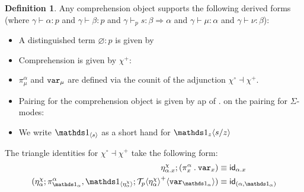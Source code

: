 \documentclass[10pt]{article}
\theoremstyle{definition}
\newtheorem{definition}{Definition}
\let\emptyset\varnothing
\newcommand\dsd[1]{\ensuremath{\mathsf{#1}}}
\newcommand{\yields}{\vdash}
\newcommand{\tcell}{\Rightarrow}
\newcommand{\app}[2]{\ensuremath{#1 \: #2}}
\newcommand{\fst}[1]{\app{\dsd{fst}}{#1}}
\newcommand{\snd}[1]{\app{\dsd{snd}}{#1}}
\newcommand{\id}{\mathsf{id}}
\newcommand\TermTwoT[5]{\ensuremath{#1 \vdash_{#5} {#2} : #3 \tcell #4}}
\newcommand\TrPlus[2]{\ensuremath{{#1}^+(#2)}}
\newcommand\El[2]{\mathcal{T}_{#1}(#2)}
\newcommand\ApEl[2]{\mathcal{T}_{#1}\langle#2\rangle}
\newcommand\bdot[0]{\mathbin{.}}
\newcommand\ap[2]{\ensuremath{#1 \langle #2 \rangle }}
\newcommand\ApPlus[2]{\ensuremath{{#1}^+ \langle #2 \rangle }}
\begin{document}
\begin{definition}
Any comprehension object supports the following derived forms (where $\gamma \yields \alpha : p$
and $\gamma \yields \beta : p$ and
$\TermTwoT{\gamma}{s}{\beta}{\alpha}{p}$ and $\gamma \yields \mu :
\alpha$ and $\gamma \yields \nu : \beta$):
  \begin{itemize}
  \item A distinguished term $\emptyset : p$ is given by
  \item Comprehension is given by $\chi^+$:
  \item $\pi^\alpha_\mu$ and $\mathtt{var}_{\mu}$ are defined via the counit of the adjunction $\chi^\circ \dashv \chi^+$.
  \item Pairing for the comprehension object is given by ap of
  $.$ on the pairing for $\Sigma$-modes:
  \item We write $\ApOne{s}$ as a short hand for $\ap{\One_z}{s/z}$
  \end{itemize}
\end{definition}

The triangle identities for $\chi^\circ \dashv \chi^+$ take the following form:
\begin{align}
\eta^\chi_{\alpha.x};(\pi_x^\alpha \bdot \var{x}) &\equiv \id_{\alpha.x} \\
(\eta^\chi_\alpha ; \pi^\alpha_{\One_\alpha}, \ApOne{\eta^\chi_\alpha} ; \ApPlus{\ApEl{p}{\eta^\chi_\alpha}}{\var{\One_\alpha}}) &\equiv \id_{(\alpha, \One_\alpha)}
\end{align}
\end{document}
